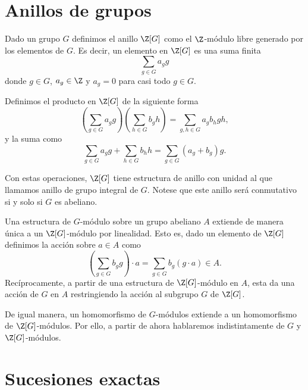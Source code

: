 %

\section{Anillos de grupos}

Dado un grupo $G$ definimos el anillo $\Z[G]$ como el $\Z$-módulo libre generado por los elementos de $G$. Es decir, un elemento en $\Z[G]$ es una suma finita
\begin{equation*}
	\sum_{g\in G} a_gg
\end{equation*}
donde $g\in G$, $a_g\in \Z$ y $a_g=0$ para casi todo $g\in G$.

Definimos el producto en $\Z[G]$ de la siguiente forma $$\left(\sum_{g\in G} a_gg\right) \left(\sum_{h\in G}b_gh\right) = \sum_{g,h\in G} a_gb_hgh,$$ y la suma como $$ \sum_{g\in G} a_gg + \sum_{h\in G}b_hh = \sum_{g\in G}(a_g+b_g)g.$$

Con estas operaciones, $\Z[G]$ tiene estructura de anillo con unidad al que llamamos anillo de grupo integral de $G$. Notese que este anillo será conmutativo si y solo si $G$ es abeliano.

\begin{observacion}
	Una estructura de $G$-módulo sobre un grupo abeliano $A$ extiende de manera única a un $\Z[G]$-módulo por linealidad. Esto es, dado un elemento de $\Z[G]$ definimos la acción sobre $a\in A$ como
	$$ \left(\sum_{g\in G}b_gg\right)\cdot a = \sum_{g\in G}b_g(g\cdot a) \in A.$$
	 Recíprocamente, a partir de una estructura de $\Z[G]$-módulo en $A$, esta da una acción de $G$ en $A$ restringiendo la acción al subgrupo $G$ de $\Z[G]$.
	
	De igual manera, un homomorfismo de $G$-módulos extiende a un homomorfismo de $\Z[G]$-módulos.
	Por ello, a partir de ahora hablaremos indistintamente de $G$ y $\Z[G]$-módulos.
\end{observacion}

\section{Sucesiones exactas}

